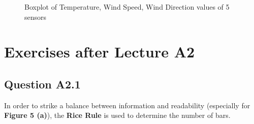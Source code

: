 \documentclass[a4paper]{article}
\begin{document}
\begin{figure}[htbp]
{\begin{minipage}[t]{0.33\linewidth}
\end{minipage}%
}%
%
\centering
\caption{Boxplot of Temperature, Wind Speed, Wind Direction values of 5 sensors}
\end{figure}

\section{Exercises after Lecture A2}
\subsection{Question A2.1}

In order to strike a balance between information and readability (especially for \textbf{Figure 5 (a)}), the \textbf{Rice Rule} is used to determine the number of bars.
\end{document}
